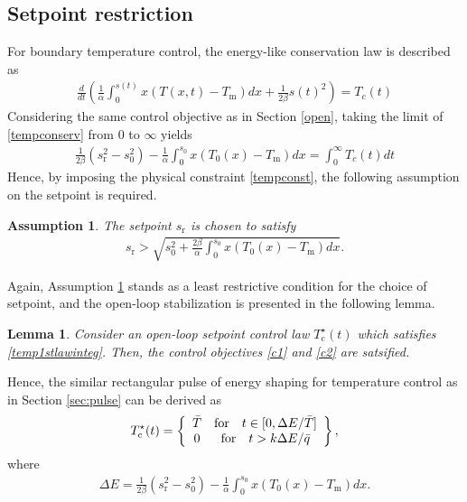 \documentclass[journal]{IEEEtran}
\newtheorem{assum}{Assumption}
\newtheorem{lem}{Lemma}
\begin{document}
\subsection{Setpoint restriction}
For boundary temperature control, the energy-like conservation law is described as 
\begin{align}\label{tempconserv}
\frac{d}{dt} \left(\frac{1}{\alpha} \int_{0}^{s(t)} x (T(x,t)-T_{{\mathrm m}}) dx + \frac{1}{2\beta} s(t)^2 \right) = T_{c}(t)
\end{align}
Considering the same control objective as in Section \ref{open}, taking the limit of \eqref{tempconserv} from $0$ to $\infty$ yields 
\begin{align}\label{temp1stlawinteg}
\frac{1}{2\beta} (s_{{\mathrm r}}^2 - s_0^2) - \frac{1}{\alpha} \int_0^{s_0} x (T_0(x) - T_{{\mathrm m}}) dx = \int_0^{\infty} T_{c}(t) dt
\end{align}
Hence, by imposing the physical constraint \eqref{tempconst}, the following assumption on the setpoint is required. 
\begin{assum}\label{tempsetpoint}
The setpoint $s_{{\mathrm r}}$ is chosen to satisfy 
\begin{align}\label{tempcompatibility}
s_{{\mathrm r}}>\sqrt{ s_0^2+\frac{2 \beta}{\alpha }\int_{0}^{s_0} x(T_0(x)-T_{{\mathrm m}}) dx}. 
\end{align}
\end{assum}
Again, Assumption \ref{tempsetpoint} stands as a least restrictive condition for the choice of setpoint, and the open-loop stabilization is presented in the following lemma. 
\begin{lem}\label{rec}
Consider an open-loop setpoint control law $T^{\star}_{{\mathrm c}}(t)$ which satisfies \eqref{temp1stlawinteg}.  Then, the control objectives \eqref{c1} and \eqref{c2} are satsified. \end{lem}
Hence, the similar rectangular pulse of energy shaping for temperature control as in Section \ref{sec:pulse} can be derived as 
\begin{align}\label{pulsetemp}
T^{\star}_{{\mathrm c}}(t) = 
\left \{
\begin{array}{cc}
\bar{T} &{\rm for}\quad t\in [0, \Delta E/\bar{T}]\\
0  &{\rm for}\quad t>k\Delta E/\bar{q}
\end{array}
\right \},
\end{align}
 where 
 \begin{align}\label{1stlawintegopentemp}
\Delta E= \frac{1}{2\beta}(s_{{\mathrm r}}^2-s_0^2)-\frac{1}{\alpha}\int_{0}^{s_0} x(T_0(x)-T_{{\mathrm m}}) dx.
\end{align}
\end{document}
